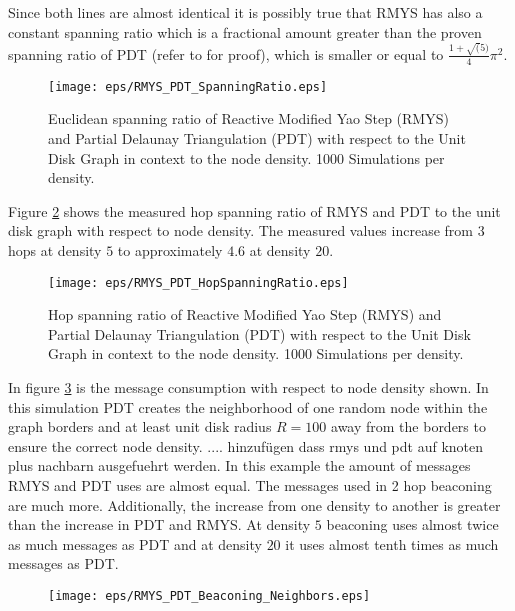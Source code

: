 Since both lines are almost identical it is possibly true that RMYS has also a constant spanning ratio which is a fractional amount greater than the proven spanning ratio of PDT (refer to \cite{Neumann2012} for proof), which is smaller or equal to $\frac{1+\sqrt(5)}{4} \pi^2 $. 

\begin{figure}[h!]
\centering
\texttt{[image: eps/RMYS\_PDT\_SpanningRatio.eps]}
\caption{Euclidean spanning ratio of Reactive Modified Yao Step (RMYS) and Partial Delaunay Triangulation (PDT) with respect to the Unit Disk Graph in context to the node density. 1000 Simulations per density.}
\label{fig:RMYS_PDT_SpanningRatio}
\end{figure}


Figure \ref{fig:RMYS_PDT_HopSpanningRatio} shows the measured hop spanning ratio of RMYS and PDT to the unit disk graph with respect to node density.
The measured values increase from $3 $ hops at density $5 $ to approximately $4.6 $ at density $20 $.

\begin{figure}[h!]
\centering
\texttt{[image: eps/RMYS\_PDT\_HopSpanningRatio.eps]}
\caption{Hop spanning ratio of Reactive Modified Yao Step (RMYS) and Partial Delaunay Triangulation (PDT) with respect to the Unit Disk Graph in context to the node density. 1000 Simulations per density.}
\label{fig:RMYS_PDT_HopSpanningRatio}
\end{figure}



In figure \ref{fig:RMYS_PDT_Beaconing_Neighbors.eps} is the message consumption with respect to node density shown.
In this simulation PDT creates the neighborhood of one random node within the graph borders and at least unit disk radius $R=100 $ away from the borders to ensure the correct node density. .... hinzufügen dass rmys und pdt auf knoten plus nachbarn ausgefuehrt werden.
In this example the amount of messages RMYS and PDT uses are almost equal.
The messages used in 2 hop beaconing are much more.
Additionally, the increase from one density to another is greater than the increase in PDT and RMYS.
At density $5 $ beaconing uses almost twice as much messages as PDT and at density $20 $ it uses almost tenth times as much messages as PDT.

\begin{figure}[h!]
\centering
\texttt{[image: eps/RMYS\_PDT\_Beaconing\_Neighbors.eps]}
\caption{}
\label{fig:RMYS_PDT_Beaconing_Neighbors.eps}
\end{figure}

